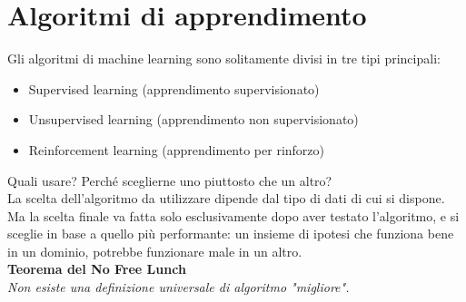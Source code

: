 \documentclass[a4paper,12pt]{report}
\begin{document}
\chapter{Algoritmi di apprendimento}
Gli algoritmi di machine learning sono solitamente divisi in tre tipi principali:
\begin{itemize}
\item Supervised learning (apprendimento supervisionato)
\item Unsupervised learning (apprendimento non supervisionato)
\item Reinforcement learning (apprendimento per rinforzo)
\end{itemize}
Quali usare? Perch\'{e} sceglierne uno piuttosto che un altro?\\
La scelta dell'algoritmo da utilizzare dipende dal tipo di dati di cui si dispone. Ma la scelta finale va fatta solo esclusivamente dopo aver testato l'algoritmo, e si sceglie in base a quello pi\`{u} performante: un insieme di ipotesi che funziona bene in un dominio, potrebbe funzionare male in un altro.\\
\textbf{Teorema del No Free Lunch \cite[Wolper,1996]{NFL}}\\
\textit{Non esiste una definizione universale di algoritmo "migliore".}
\end{document}
